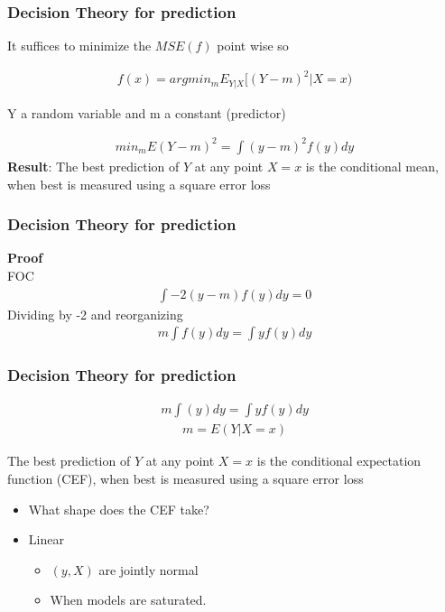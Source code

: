 \documentclass[
  shownotes,
  xcolor={svgnames},
  hyperref={colorlinks,citecolor=DarkBlue,linkcolor=DarkRed,urlcolor=DarkBlue}
  , aspectratio=169]{beamer}
\begin{document}
\begin{frame}
\frametitle{ Decision Theory for prediction}


It suffices to minimize  the $MSE(f)$ point wise so

\begin{align}
f(x)= argmin_m E_{Y|X} [(Y-m)^2|X=x)
\end{align}

Y a random variable and m a constant (predictor)

\begin{align}
min_m E(Y-m)^2= \int (y-m)^2  f(y)dy
\end{align}
\medskip
{\bf Result}: The best prediction of $Y$ at any point $X = x$ is the conditional mean, when best is measured using a square error loss

\end{frame}

\begin{frame}[t]
\frametitle{ Decision Theory for prediction}

{\bf Proof} \\
\medskip
FOC
\medskip
\begin{align}
\int -2 (y-m)  f(y)  dy =0
\end{align}
\medskip
Dividing by -2 and reorganizing
\medskip
\begin{align}
 m \int f(y) dy = \int y f(y)  dy
\end{align}


\end{frame}

\begin{frame}
\frametitle{ Decision Theory for prediction}


\begin{align}
 m \int (y) dy = \int y f(y)  dy
\end{align}
\begin{align}
m=E(Y|X=x)
\end{align}


The best prediction of $Y$ at any point $X = x$ is the conditional expectation function (CEF), when best is measured using a square error loss
\begin{itemize}
\item What shape does the CEF take?
\item Linear 
\begin{itemize}
\item $(y,X)$ are jointly normal
\item When models are saturated.
\end{itemize}
\end{itemize}


\end{frame}
\end{document}
